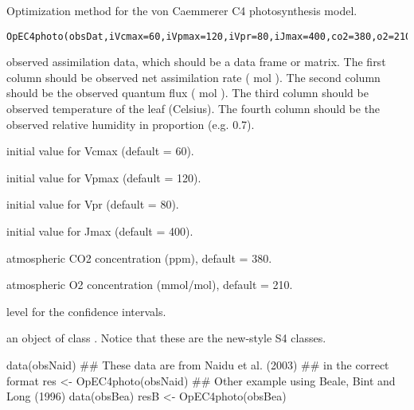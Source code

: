 \documentclass[letterpaper]{book}
\begin{document}
%
\begin{Description}\relax

Optimization method for the von Caemmerer C4 photosynthesis model.

\end{Description}
%
\begin{Usage}
\begin{verbatim}
OpEC4photo(obsDat,iVcmax=60,iVpmax=120,iVpr=80,iJmax=400,co2=380,o2=210,level=0.95)
\end{verbatim}
\end{Usage}
%
\begin{Arguments}
\begin{ldescription}

\item[\code{obsDat}]  observed assimilation data, which should be a data
frame or matrix.
The first column should be observed net
assimilation rate  (\eqn{\mu}{} mol  ).
The second column should be the observed
quantum flux  (\eqn{\mu}{} mol  ).
The third column should be observed temperature of the leaf
(Celsius).
The fourth column should be the observed relative humidity
in proportion (e.g. 0.7).

\item[\code{iVcmax}] initial value for Vcmax (default = 60).
\item[\code{iVpmax}] initial value for Vpmax (default = 120).
\item[\code{iVpr}] initial value for Vpr (default = 80).
\item[\code{iJmax}] initial value for Jmax (default = 400).
\item[\code{co2}] atmospheric CO2 concentration (ppm), default = 380.
\item[\code{o2}] atmospheric O2 concentration (mmol/mol), default = 210.
\item[\code{level}] level for the confidence intervals.
\end{ldescription}
\end{Arguments}
%
\begin{Value}

an object of class . Notice that these are
the new-style S4 classes. 
\end{Value}
%
\begin{Examples}
\begin{ExampleCode}
data(obsNaid)
## These data are from Naidu et al. (2003)
## in the correct format
res <- OpEC4photo(obsNaid)
## Other example using Beale, Bint and Long (1996)
data(obsBea)
resB <- OpEC4photo(obsBea)
\end{ExampleCode}
\end{Examples}
\end{document}
